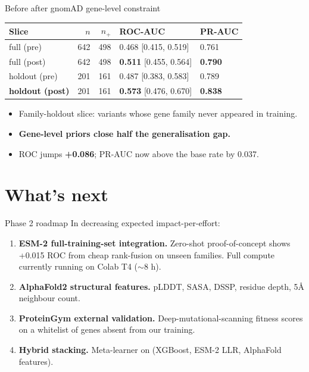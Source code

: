 \documentclass[aspectratio=169]{beamer}
\begin{document}
\begin{frame}{Before \vs after gnomAD gene-level constraint}
  \small
  \centering
  \begin{tabular}{@{} l r r l l @{}}
    \toprule
    Slice & $n$ & $n_+$ & ROC-AUC & PR-AUC \\
    \midrule
    full (pre)       & 642 & 498 & 0.468 [0.415, 0.519] & 0.761 \\
    full (post)      & 642 & 498 & \textbf{0.511} [0.455, 0.564] & \textbf{0.790} \\
    \rowcolor{yellow!25}
    holdout (pre)    & 201 & 161 & 0.487 [0.383, 0.583] & 0.789 \\
    \rowcolor{yellow!25}
    \textbf{holdout (post)} & 201 & 161 & \textbf{0.573} [0.476, 0.670] & \textbf{0.838} \\
    \bottomrule
  \end{tabular}
  \vspace{0.7em}
  \begin{itemize}
    \item Family-holdout slice: variants whose gene family never
          appeared in training.
    \item \textbf{Gene-level priors close half the generalisation
          gap.}
    \item ROC jumps \textbf{+0.086}; PR-AUC now above the base
          rate by 0.037.
  \end{itemize}
\end{frame}


\section{What's next}

\begin{frame}{Phase 2 roadmap}
  In decreasing expected impact-per-effort:
  \begin{enumerate}
    \item \textbf{ESM-2 full-training-set integration.}
          Zero-shot proof-of-concept shows +0.015 ROC from
          cheap rank-fusion on unseen families.
          Full compute currently running on Colab T4 ($\sim$8 h).
    \item \textbf{AlphaFold2 structural features.}
          pLDDT, SASA, DSSP, residue depth, 5\AA{} neighbour count.
    \item \textbf{ProteinGym external validation.}
          Deep-mutational-scanning fitness scores on a whitelist
          of genes absent from our training.
    \item \textbf{Hybrid stacking.}
          Meta-learner on (XGBoost, ESM-2 LLR, AlphaFold features).
  \end{enumerate}
\end{frame}
\end{document}
